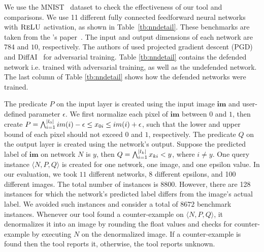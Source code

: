We use the MNIST~\cite{deng2012mnist} dataset to check the effectiveness of our tool and comparisons. We use 11 different fully connected feedforward neural networks with $\textsc{ReLU}${} activation, as shown in Table~\ref{tb:nndetail}.
These benchmarks are taken from the \deeppoly{}'s paper~\cite{singh2019abstract}.  The input and output dimensions of each network are $784$ and $10$, respectively.  The authors of \deeppoly{} used projected gradient descent (PGD)~\cite{dong2018boosting}
and DiffAI~\cite{mirman2018differentiable} for adversarial training. Table \ref{tb:nndetail} contains the defended network i.e.
trained with adversarial training, as well as the undefended network. The last column of Table \ref{tb:nndetail} shows how the defended networks were trained.  

The predicate $P$ on the input layer is created using the input image $\boldsymbol{im}$ and user-defined parameter $\epsilon$.  We first normalize each pixel of $\boldsymbol{im}$ between $0$ and $1$, then create  $P = \bigwedge_{i=1}^{|l_0|} im(i)-\epsilon \leq x_{0i}\leq im(i)+\epsilon$, such that the lower and upper bound of each pixel should not exceed $0$ and $1$, respectively. The predicate $Q$ on the output layer is created using the network's output.     Suppose the predicted label of $\boldsymbol{im}$ on network $N$ is $y$, then $Q = \bigwedge_{i=1}^{|l_k|} x_{ki} < y$, where $i \neq y$.  One query instance $\langle N,P,Q \rangle$ is created for one network, one image, and one epsilon value.  In our evaluation, we took $11$ different networks, 8 different epsilons, and 100 different images. The total number of instances is $8800$. However, there are 128 instances for which the network's predicted label differs from the image's actual label. We avoided such instances and consider a total of $8672$ benchmark instances.    Whenever our tool found a counter-example on $\langle N,P,Q \rangle$, it denormalizes it into an image by rounding the float values 
and checks for counter-example by executing $N$ on the denormalized image.
If a counter-example is found then the tool reports it, otherwise, the tool reports unknown.

